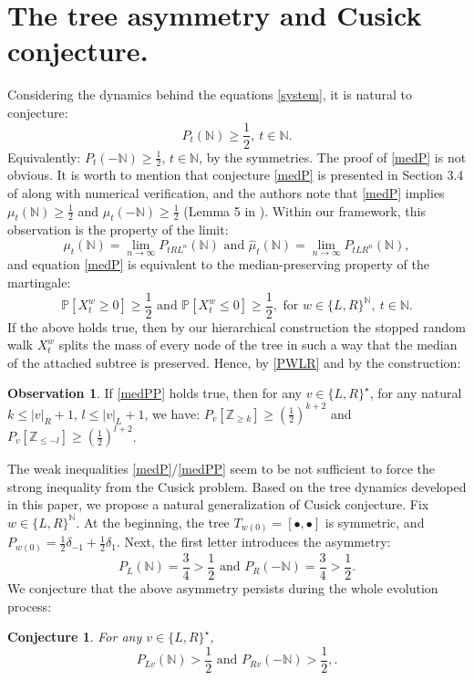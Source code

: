 \documentclass[10pt]{amsart}
\newtheorem{conjecture}[theorem]{Conjecture}
\theoremstyle{definition}
\newtheorem{observation}[theorem]{Observation}
\numberwithin{equation}{section}
\newcommand{\N}{\mathbb{N}}
\newcommand{\Z}{\mathbb{Z}}
\newcommand{\PP}{\mathbb{P}}
\begin{document}
\section{The tree asymmetry  and Cusick conjecture.}\label{CUS}
Considering the dynamics behind the equations \eqref{system}, it is natural to conjecture:
\begin{equation}\label{medP}
P_t(\N)\geq\frac12,\ t\in\N.
\end{equation}
Equivalently: $P_t(-\N)\geq\frac12$, $t\in\N$, by the symmetries. The proof of \eqref{medP} is not obvious. It is worth to mention that conjecture \eqref{medP} is presented in Section 3.4 of \cite{drmota} along with numerical verification, and the  authors note that \eqref{medP} implies $\mu_t(\N)\geq\frac12$ and $\mu_t(-\N)\geq\frac12$ (Lemma 5 in \cite{drmota}). Within our framework, this observation is the property of the limit:
$$\mu_t(\N)=\lim\limits_{n\to\infty}P_{tRL^n}(\N)\mbox{ and }\hat{\mu}_t(\N)=\lim\limits_{n\to\infty}P_{tLR^n}(\N),$$
and equation \eqref{medP} is equivalent to the median-preserving property of the martingale:
\begin{equation}\label{medPP}
\PP[X^w_t\geq 0]\geq\frac12\mbox{ and }\PP[X^w_t\leq 0]\geq\frac12,\mbox{ for  }w\in\{L,R\}^\N,\ t\in\N.
\end{equation}
If the above holds true, then by our hierarchical construction the stopped random walk $X^w_t$ splits the mass of every node of the tree in such a way that the median of the attached subtree is preserved.  Hence,  by \eqref{PWLR} and by the construction:
\begin{observation}
If \eqref{medPP} holds true, then for any $v\in\{L,R\}^\star$, for any natural $k\leq |v|_R+1$, $l\leq |v|_L+1$, we have: $P_v[\Z_{\geq k}]\geq (\frac{1}{2})^{k+2}$ and $P_v[\Z_{\leq -l}]\geq (\frac{1}{2})^{l+2}$.
\end{observation}
The  weak inequalities \eqref{medP}/\eqref{medPP} seem to be not sufficient to force the strong inequality from the Cusick problem. Based on the tree dynamics developed in this paper, we propose a natural generalization of Cusick conjecture. Fix $w\in\{L,R\}^\N$. At the beginning, the tree $T_{w(0)}=[\bullet,\bullet]$ is symmetric, and $P_{w(0)}=\frac12\delta_{-1}+\frac12\delta_1$. Next, the first letter introduces the asymmetry:
$$P_{L}(\N)=\frac34>\frac12\mbox{ and }P_{R}(-\N)=\frac34>\frac12.$$
We conjecture that the above asymmetry persists during the whole evolution process:
\begin{conjecture}\label{Azyan} For any $v\in\{L,R\}^{\star}$,
\begin{equation}\label{concon}
P_{Lv}(\N)>\frac12\mbox{ and }P_{Rv}(-\N)>\frac12,.
\end{equation}
\end{conjecture}
\end{document}
